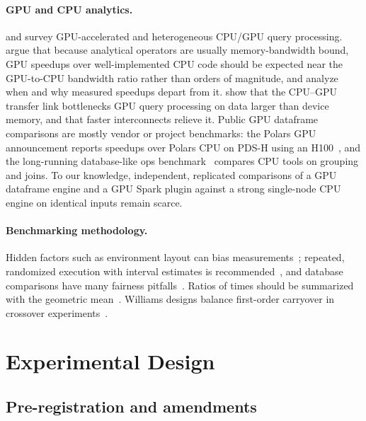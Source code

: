 \documentclass[11pt]{article}
\begin{document}
\paragraph{GPU and CPU analytics.} \citet{bress2014gpudb} and
\citet{rosenfeld2022heterogeneous} survey GPU-accelerated and heterogeneous
CPU/GPU query processing. \citet{shanbhag2020gpucpu} argue that because
analytical operators are usually memory-bandwidth bound, GPU speedups over
well-implemented CPU code should be expected near the GPU-to-CPU bandwidth
ratio rather than orders of magnitude, and analyze when and why measured
speedups depart from it. \citet{lutz2020pump} show that the CPU--GPU transfer
link bottlenecks GPU query processing on data larger than device memory, and
that faster interconnects relieve it. Public GPU dataframe comparisons are
mostly vendor or project benchmarks: the Polars GPU announcement reports
speedups over Polars CPU on PDS-H using an H100~\citep{semaan2024polarsgpu},
and the long-running database-like ops benchmark~\citep{dbbenchmark} compares
CPU tools on grouping and joins. To our knowledge, independent, replicated
comparisons of a GPU dataframe engine and a GPU Spark plugin against a strong
single-node CPU engine on identical inputs remain scarce.

\paragraph{Benchmarking methodology.} Hidden factors such as environment
layout can bias measurements~\citep{mytkowicz2009wrong}; repeated, randomized
execution with interval estimates is recommended~\citep{kalibera2013rigorous,
hoefler2015scientific}, and database comparisons have many fairness
pitfalls~\citep{raasveldt2018fair}. Ratios of times should be summarized with
the geometric mean~\citep{fleming1986geomean}. Williams designs balance
first-order carryover in crossover experiments~\citep{williams1949latin}.

\section{Experimental Design}
\label{sec:design}

\subsection{Pre-registration and amendments}
\label{sec:prereg}
\end{document}
